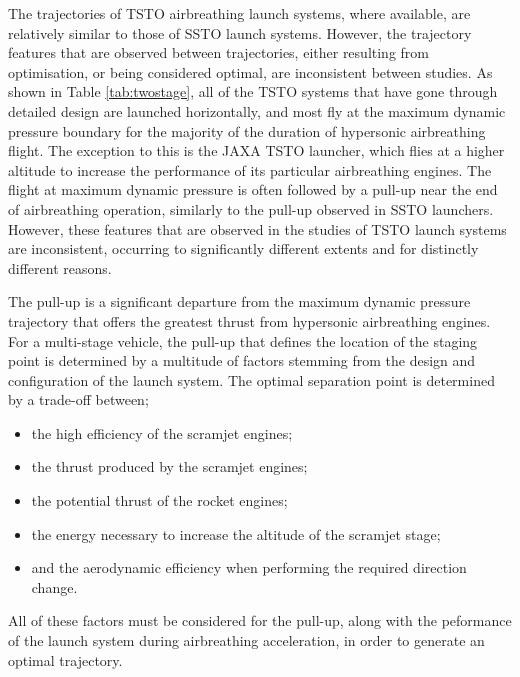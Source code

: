 The trajectories of TSTO airbreathing launch systems, where available, are relatively similar to those of SSTO launch systems. However, the trajectory features that are observed between trajectories, either resulting from optimisation, or being considered optimal, are inconsistent between studies. As shown in Table \ref{tab:twostage}, all of the TSTO systems that have gone through detailed design are launched horizontally, and most fly at the maximum dynamic pressure boundary for the majority of the duration of hypersonic airbreathing flight. The exception to this is the JAXA TSTO launcher, which flies at a higher altitude to increase the performance of its particular airbreathing engines. The flight at maximum dynamic pressure is often followed by a pull-up near the end of airbreathing operation, similarly to the pull-up observed in SSTO launchers. 
However, these features that are observed in the studies of TSTO launch systems are inconsistent, occurring to significantly different extents and for distinctly different reasons. 

The pull-up is a significant departure from the maximum dynamic pressure trajectory that offers the greatest thrust from hypersonic airbreathing engines.
For a multi-stage vehicle, the pull-up that defines the location of the staging point is determined by a multitude of factors stemming from the design and configuration of the launch system. The optimal separation point is determined by a trade-off between;
\begin{itemize}
	\item the high efficiency of the scramjet engines;
	\item the thrust produced by the scramjet engines;
	\item the potential thrust of the rocket engines;
	\item the energy necessary to increase the altitude of the scramjet stage;
	\item and the aerodynamic efficiency when performing the required direction change.
\end{itemize}
All of these factors must be considered for the pull-up, along with the peformance of the launch system during airbreathing acceleration, in order to generate an optimal trajectory. 

